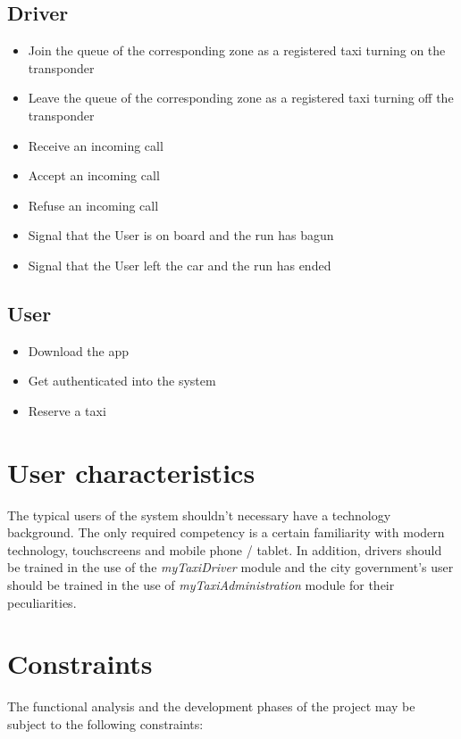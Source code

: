 \documentclass[12pt,a4paper]{book}
\begin{document}
			\subsection{Driver}
				\begin{itemize}
					\item[\textbullet] Join the queue of the corresponding zone as a registered taxi turning on the transponder
					\item[\textbullet] Leave the queue of the corresponding zone as a registered taxi turning off the transponder
					\item[\textbullet] Receive an incoming call
					\item[\textbullet] Accept an incoming call
					\item[\textbullet] Refuse an incoming call
					\item[\textbullet] Signal that the User is on board and the run has bagun
					\item[\textbullet] Signal that the User left the car and the run has ended
				\end{itemize}
			\subsection{User}
				\begin{itemize}
					\item[\textbullet] Download the app
					\item[\textbullet] Get authenticated into the system
					\item[\textbullet] Reserve a taxi
				\end{itemize}
		\section{User characteristics}
		The typical users of the system shouldn't necessary have a technology background. The only required competency is a certain familiarity with modern technology, touchscreens and mobile phone / tablet.
		In addition, drivers should be trained in the use of the \textit{myTaxi\textunderscore Driver} module and the city government's user should be trained in the use of \textit{myTaxi\textunderscore Administration} module for their peculiarities.
		\section{Constraints}
		The functional analysis and the development phases of the project may be subject to the following constraints:
\end{document}
